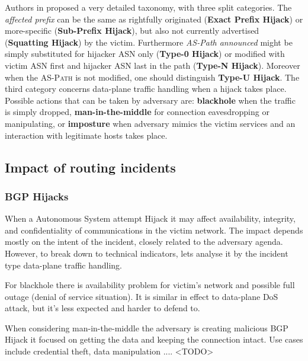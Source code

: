 Authors in \cite{Sermpezis2018a} proposed a very detailed taxonomy, with three split categories.  The \emph{affected prefix} can be the same as rightfully originated (\textbf{Exact Prefix Hijack}) or more-specific (\textbf{Sub-Prefix Hijack}), but also not currently advertised (\textbf{Squatting Hijack}) by the victim. Furthermore \emph{AS-Path announced} might be simply substituted for hijacker ASN only (\textbf{Type-0 Hijack}) or modified with victim ASN first and hijacker ASN last in the path (\textbf{Type-N Hijack}). Moreover when the \textsc{AS-Path} is not modified, one should distinguish \textbf{Type-U Hijack}. The third category concerns data-plane traffic handling when a hijack takes place. Possible actions that can be taken by adversary are: \textbf{blackhole} when the traffic is simply dropped, \textbf{man-in-the-middle} for connection eavesdropping or manipulating, or \textbf{imposture} when adversary mimics the victim services and an interaction with legitimate hosts takes place.



\subsection{Impact of routing incidents}
\label{def:impact}
\subsubsection{BGP Hijacks}
\label{def:impact:hj}
When a Autonomous System attempt Hijack it may affect availability, integrity, and confidentiality of communications in the victim network. The impact depends mostly on the intent of the incident, closely related to the adversary agenda. However, to break down to technical indicators, lets analyse it by the incident type data-plane traffic handling. 

For blackhole there is availability problem for victim's network and possible full outage (denial of service situation). It is similar in effect to data-plane DoS attack, but it's less expected and harder to defend to. 

When considering man-in-the-middle the adversary is creating malicious BGP Hijack it focused on getting the data and keeping the connection intact. Use cases include credential theft, data manipulation .... <TODO>


